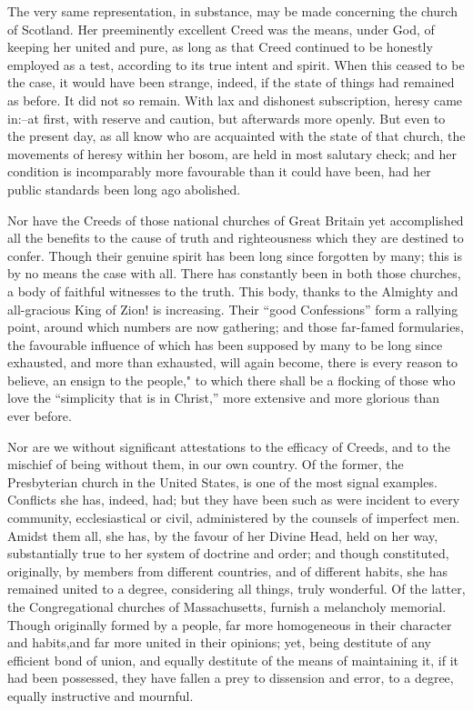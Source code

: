 \documentclass[
]{book}
\begin{document}
The very same representation, in substance, may be made concerning the church of Scotland. Her preeminently excellent Creed was the means, under God, of keeping her united and pure, as long as that Creed continued to be honestly employed as a test, according to its true intent and spirit. When this ceased to be the case, it would have been strange, indeed, if the state of things had remained as before. It did not so remain. With lax and dishonest subscription, heresy came in:--at first, with reserve and caution, but afterwards more openly. But even to the present day, as all know who are acquainted with the state of that church, the movements of heresy within her bosom, are held in most salutary check; and her condition is incomparably more favourable than it could have been, had her public standards been long ago abolished.

Nor have the Creeds of those national churches of Great Britain yet accomplished all the benefits to the cause of truth and righteousness which they are destined to confer. Though their genuine spirit has been long since forgotten by many; this is by no means the case with all. There has constantly been in both those churches, a body of faithful witnesses to the truth. This body, thanks to the Almighty and all-gracious King of Zion! is increasing. Their ``good Confessions'' form a rallying point, around which numbers are now gathering; and those far-famed formularies, the favourable influence of which has been supposed by many to be long since exhausted, and more than exhausted, will again become, there is every reason to believe, an ensign to the people," to which there shall be a flocking of those who love the ``simplicity that is in Christ,'' more extensive and more glorious than ever before.

Nor are we without significant attestations to the efficacy of Creeds, and to the mischief of being without them, in our own country. Of the former, the Presbyterian church in the United States, is one of the most signal examples. Conflicts she has, indeed, had; but they have been such as were incident to every community, ecclesiastical or civil, administered by the counsels of imperfect men. Amidst them all, she has, by the favour of her Divine Head, held on her way, substantially true to her system of doctrine and order; and though constituted, originally, by members from different countries, and of different habits, she has remained united to a degree, considering all things, truly wonderful. Of the latter, the Congregational churches of Massachusetts, furnish a melancholy memorial. Though originally formed by a people, far more homogeneous in their character and habits,and far more united in their opinions; yet, being destitute of any efficient bond of union, and equally destitute of the means of maintaining it, if it had been possessed, they have fallen a prey to dissension and error, to a degree, equally instructive and mournful.
\end{document}
